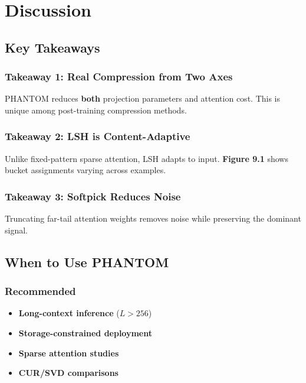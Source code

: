 
\section{Discussion}

\subsection{Key Takeaways}

\subsubsection{Takeaway 1: Real Compression from Two Axes}

PHANTOM reduces \textbf{both} projection parameters and attention cost. This is 
unique among post-training compression methods.

\subsubsection{Takeaway 2: LSH is Content-Adaptive}

Unlike fixed-pattern sparse attention, LSH adapts to input. \textbf{Figure 9.1} 
shows bucket assignments varying across examples.

\subsubsection{Takeaway 3: Softpick Reduces Noise}

Truncating far-tail attention weights removes noise while preserving the 
dominant signal.

\subsection{When to Use PHANTOM}

\subsubsection{Recommended}

\begin{itemize}
\item \textbf{Long-context inference} ($L > 256$)
\item \textbf{Storage-constrained deployment}
\item \textbf{Sparse attention studies}
\item \textbf{CUR/SVD comparisons}

\end{itemize}
